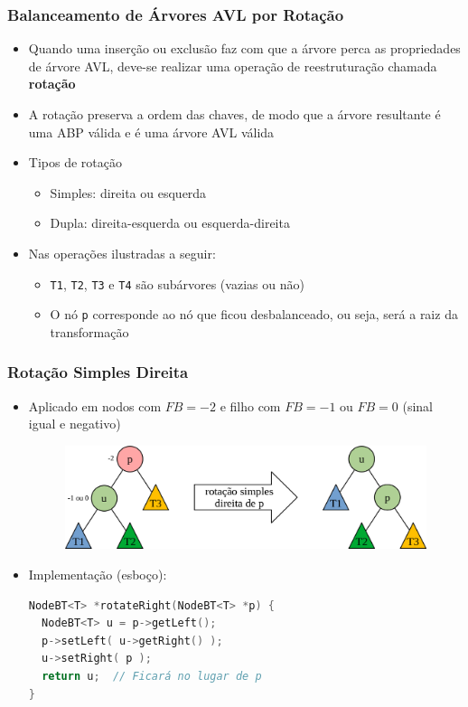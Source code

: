 \documentclass[aspectratio=169]{beamer}
\begin{document}
\begin{frame}\frametitle{Balanceamento de Árvores AVL por Rotação}
\begin{itemize}
	\item Quando uma inserção ou exclusão faz com que a árvore perca as propriedades de árvore AVL, deve-se realizar uma operação de reestruturação chamada \textbf{rotação}
	\item A rotação preserva a ordem das chaves, de modo que a árvore resultante é uma ABP válida e é uma árvore AVL válida
	\item Tipos de rotação
	\begin{itemize}
		\item Simples: direita ou esquerda
		\item Dupla: direita-esquerda ou esquerda-direita
	\end{itemize}
	\item Nas operações ilustradas a seguir:
	\begin{itemize}
		\item \texttt{T1}, \texttt{T2}, \texttt{T3} e \texttt{T4} são subárvores (vazias ou não)
		\item O nó \texttt{p} corresponde ao nó que ficou desbalanceado, ou seja, será a raiz da transformação
	\end{itemize}
\end{itemize}
\end{frame}

\begin{frame}[fragile]\frametitle{Rotação Simples Direita}
\begin{itemize}
	\item Aplicado em nodos com $FB = -2$ e filho com $FB = -1$ ou $FB = 0$ (sinal igual e negativo)
\begin{figure}[h]
	\centering
	\includegraphics[height=0.3\paperheight]{imagens/rot_sim_dir.png}
\end{figure}
	\item Implementação (esboço):
\begin{lstlisting}[language=C++,basicstyle=\ttfamily\scriptsize]
NodeBT<T> *rotateRight(NodeBT<T> *p) {
  NodeBT<T> u = p->getLeft();
  p->setLeft( u->getRight() );
  u->setRight( p );
  return u;  // Ficará no lugar de p
}
\end{lstlisting}
\end{itemize}
\end{frame}
\end{document}
